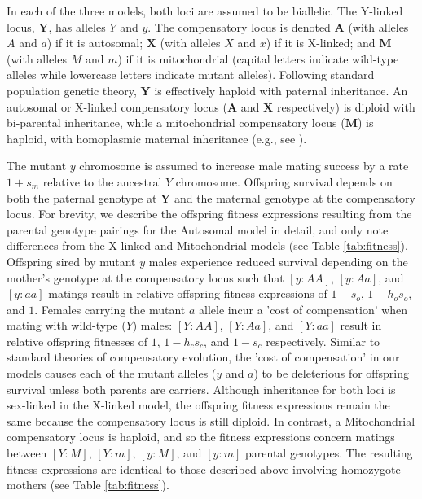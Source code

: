 \documentclass{article}
\begin{document}
In each of the three models, both loci are assumed to be biallelic. The Y-linked locus, $\mathbf{Y}$, has alleles $Y$ and $y$. The compensatory locus is denoted $\mathbf{A}$ (with alleles $A$ and $a$) if it is autosomal; $\mathbf{X}$ (with alleles $X$ and $x$) if it is X-linked; and $\mathbf{M}$ (with alleles $M$ and $m$) if it is mitochondrial (capital letters indicate wild-type alleles while lowercase letters indicate mutant alleles). Following standard population genetic theory, $\mathbf{Y}$ is effectively haploid with paternal inheritance. An autosomal or X-linked compensatory locus ($\mathbf{A}$ and $\mathbf{X}$ respectively) is diploid with bi-parental inheritance, while a mitochondrial compensatory locus ($\mathbf{M}$) is haploid, with homoplasmic maternal inheritance (e.g., see \citealt{FrankHurst1996,ConnallonDowling2017,Roze-etal2005}).

The mutant $y$ chromosome is assumed to increase male mating success by a rate $1 + s_m$ relative to the ancestral $Y$ chromosome. Offspring survival depends on both the paternal genotype at $\mathbf{Y}$ and the maternal genotype at the compensatory locus. For brevity, we describe the offspring fitness expressions resulting from the parental genotype pairings for the Autosomal model in detail, and only note differences from the X-linked and Mitochondrial models (see Table \ref{tab:fitness}). Offspring sired by mutant $y$ males experience reduced survival depending on the mother's genotype at the compensatory locus such that $[y:AA]$, $[y:Aa]$, and $[y:aa]$ matings result in relative offspring fitness expressions of $1 - s_o$, $1 - h_o s_o$, and $1$. Females carrying the mutant $a$ allele incur a 'cost of compensation' when mating with wild-type ($Y$) males: $[Y:AA]$, $[Y:Aa]$, and $[Y:aa]$ result in relative offspring fitnesses of $1$, $1 - h_c s_c$, and $1 - s_c$ respectively. Similar to standard theories of compensatory evolution, the 'cost of compensation' in our models causes each of the mutant alleles ($y$ and $a$) to be deleterious for offspring survival unless both parents are carriers. Although inheritance for both loci is sex-linked in the X-linked model, the offspring fitness expressions remain the same because the compensatory locus is still diploid. In contrast, a Mitochondrial compensatory locus is haploid, and so the fitness expressions concern matings between $[Y:M]$, $[Y:m]$, $[y:M]$, and $[y:m]$ parental genotypes. The  resulting fitness expressions are identical to those described above involving homozygote mothers (see Table \ref{tab:fitness}).
\end{document}
